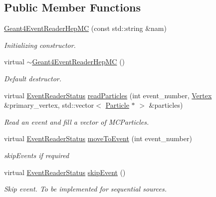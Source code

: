 \subsection*{Public Member Functions}
\begin{DoxyCompactItemize}
\item 
\hyperlink{class_d_d4hep_1_1_simulation_1_1_geant4_event_reader_hep_m_c_adc7e0e034d70567c3287a72121b21d0e}{Geant4EventReaderHepMC} (const std::string \&nam)
\begin{DoxyCompactList}\small\item\em Initializing constructor. \item\end{DoxyCompactList}\item 
virtual \hyperlink{class_d_d4hep_1_1_simulation_1_1_geant4_event_reader_hep_m_c_a437c86083e7da05be4821da864d8954a}{$\sim$Geant4EventReaderHepMC} ()
\begin{DoxyCompactList}\small\item\em Default destructor. \item\end{DoxyCompactList}\item 
virtual \hyperlink{class_d_d4hep_1_1_simulation_1_1_geant4_event_reader_ae4f4bc83ffcf5b0c1868ad78859851e7}{EventReaderStatus} \hyperlink{class_d_d4hep_1_1_simulation_1_1_geant4_event_reader_hep_m_c_acb5e3d21a1eea4870b3dd73649f363ae}{readParticles} (int event\_\-number, \hyperlink{class_d_d4hep_1_1_simulation_1_1_geant4_vertex}{Vertex} \&primary\_\-vertex, std::vector$<$ \hyperlink{class_d_d4hep_1_1_simulation_1_1_geant4_particle}{Particle} $\ast$ $>$ \&particles)
\begin{DoxyCompactList}\small\item\em Read an event and fill a vector of MCParticles. \item\end{DoxyCompactList}\item 
virtual \hyperlink{class_d_d4hep_1_1_simulation_1_1_geant4_event_reader_ae4f4bc83ffcf5b0c1868ad78859851e7}{EventReaderStatus} \hyperlink{class_d_d4hep_1_1_simulation_1_1_geant4_event_reader_hep_m_c_a95ba8736c8274f5b24b6cd0e0b424c33}{moveToEvent} (int event\_\-number)
\begin{DoxyCompactList}\small\item\em skipEvents if required \item\end{DoxyCompactList}\item 
virtual \hyperlink{class_d_d4hep_1_1_simulation_1_1_geant4_event_reader_ae4f4bc83ffcf5b0c1868ad78859851e7}{EventReaderStatus} \hyperlink{class_d_d4hep_1_1_simulation_1_1_geant4_event_reader_hep_m_c_a02a4d905385f3b587ffe953e129aad5f}{skipEvent} ()
\begin{DoxyCompactList}\small\item\em Skip event. To be implemented for sequential sources. \item\end{DoxyCompactList}\end{DoxyCompactItemize}
